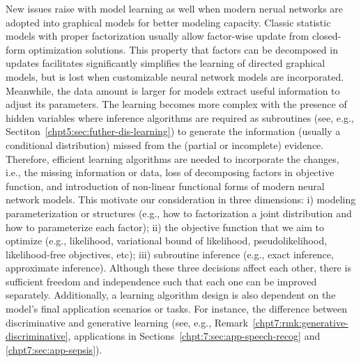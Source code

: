 New issues raise with model learning as well when modern nerual networks are adopted into graphical models for better modeling capacity. Classic statistic models with proper factorization usually allow factor-wise update from closed-form optimization solutions. This property that factors can be decomposed in updates facilitates significantly simplifies the learning of directed graphical models, but is lost when customizable neural network models are incorporated. Meanwhile, the data amount is larger for models extract useful information to adjust its parameters. The learning becomes more complex with the presence of hidden variables where inference algorithms are required as subroutines (see, e.g., Sectiton~\ref{chpt5:sec:futher-dis-learning}) to generate the information (usually a conditional distribution) missed from the (partial or incomplete) evidence.
Therefore, efficient learning algorithms are needed to incorporate the changes, i.e., the missing information or data, loss of decomposing factors in objective function, and introduction of non-linear functional forms of modern neural network models. This motivate our consideration in three dimensions: i) modeling parameterization or structures (e.g., how to factorization a joint distribution and how to parameterize each factor); ii) the objective function that we aim to optimize (e.g., likelihood, variational bound of likelihood, pseudolikelihood, likelihood-free objectives, etc); iii) subroutine inference (e.g., exact inference, approximate inference). Although these three decisions affect each other, there is sufficient freedom and independence such that each one can be improved separately. Additionally, a learning algorithm design is also dependent on the model's final application scenarios or tasks. For instance, the difference between discriminative and generative learning (see, e.g., Remark~\ref{chpt7:rmk:generative-discriminative}, applications in Sections~\ref{chpt:7:sec:app-speech-recog} and \ref{chpt7:sec:app-sepsis}).



